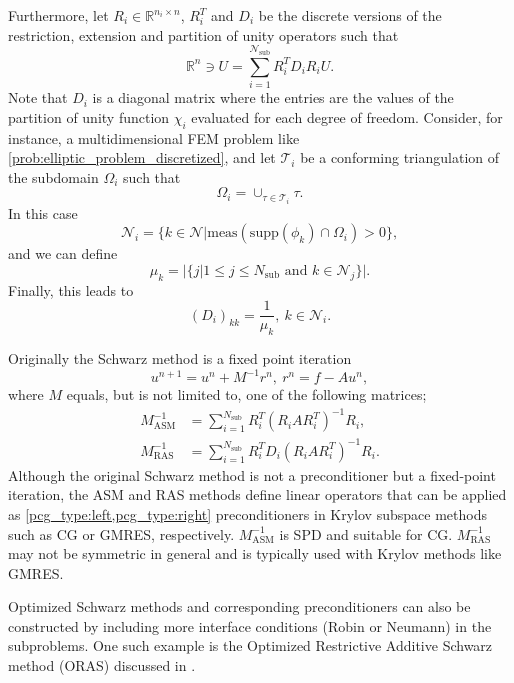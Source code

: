 Furthermore, let $R_i\in\mathbb{R}^{n_i \times n}$, $R_i^T$ and $D_i$ be the discrete versions of the restriction, extension and partition of unity operators such that
\[
    \mathbb{R}^{n}\ni U = \sum_{i=1}^{\mathcal{N}_{\text{sub}}} R_i^T D_i R_i U.
\]
Note that $D_i$ is a diagonal matrix where the entries are the values of the partition of unity function $\chi_i$ evaluated for each degree of freedom. Consider, for instance, a multidimensional FEM problem like \cref{prob:elliptic_problem_discretized}, and let $\mathcal{T}_i$ be a conforming triangulation of the subdomain $\Omega_i$ such that
\[
    \Omega_i = \cup_{\tau \in \mathcal{T}_i} \tau.
\]
In this case
\[
    \mathcal{N}_i = \{k\in\mathcal{N}| \text{meas}(\text{supp}(\phi_k)\cap\Omega_i)>0\},
\]
and we can define
\[
    \mu_k = |\{j| 1\leq j \leq N_{\text{sub}} \text{ and } k\in\mathcal{N}_j\}|.
\]
Finally, this leads to
\begin{equation}
    (D_i)_{kk} = \frac{1}{\mu_k}, \ k \in \mathcal{N}_i.
    \label{eq:schwarz_partition_of_unity_FEM}
\end{equation}

Originally the Schwarz method is a fixed point iteration \cite[Definitions 1.12 and 1.13]{schwarz_methods_Dolean_2015}
\[
    u^{n+1} = u^n + M^{-1}r^n, \ r^n = f - A u^n,
\]
where $M$ equals, but is not limited to, one of the following matrices;
\begin{subequations}
    \begin{align}
        M^{-1}_{\text{ASM}} & = \sum_{i=1}^{N_{\text{sub}}} R_i^T (R_i A R_i^T)^{-1} R_i, \label{eq:ASM_preconditioner}     \\
        M^{-1}_{\text{RAS}} & = \sum_{i=1}^{N_{\text{sub}}} R_i^T D_i (R_i A R_i^T)^{-1} R_i \label{eq:RAS_preconditioner}.
    \end{align}
\end{subequations}
Although the original Schwarz method is not a preconditioner but a fixed-point iteration, the ASM and RAS methods define linear operators that can be applied as \cref{pcg_type:left,pcg_type:right} preconditioners in Krylov subspace methods such as CG or GMRES, respectively. $M^{-1}_{\text{ASM}}$ is SPD and suitable for CG. $M^{-1}_{\text{RAS}}$ may not be symmetric in general and is typically used with Krylov methods like GMRES.

Optimized Schwarz methods and corresponding preconditioners can also be constructed by including more interface conditions (Robin or Neumann) in the subproblems. One such example is the Optimized Restrictive Additive Schwarz method (ORAS) discussed in \cite[Chapter 2]{schwarz_methods_Dolean_2015}.

